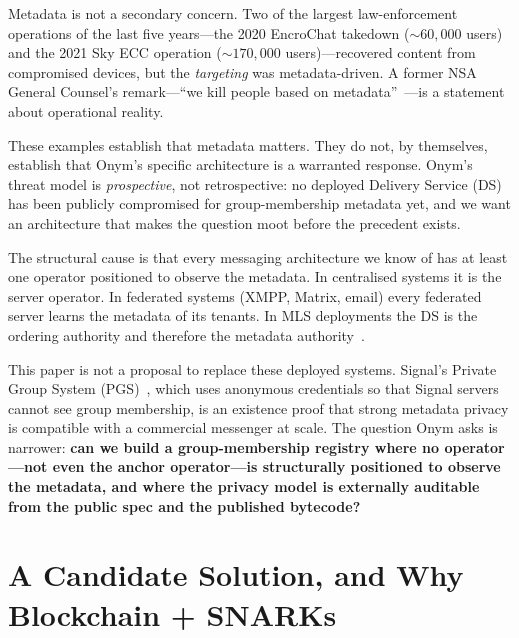 \documentclass[journal]{IEEEtran}
\begin{document}
Metadata is not a secondary concern. Two of the largest law-enforcement operations of the last five years---the 2020 EncroChat takedown (${\sim}60{,}000$ users) and the 2021 Sky ECC operation (${\sim}170{,}000$ users)---recovered content from compromised devices, but the \emph{targeting} was metadata-driven. A former NSA General Counsel's remark---``we kill people based on metadata''~\cite{hayden2014}---is a statement about operational reality.

These examples establish that metadata matters. They do not, by themselves, establish that Onym's specific architecture is a warranted response. Onym's threat model is \emph{prospective}, not retrospective: no deployed Delivery Service (DS) has been publicly compromised for group-membership metadata yet, and we want an architecture that makes the question moot before the precedent exists.

The structural cause is that every messaging architecture we know of has at least one operator positioned to observe the metadata. In centralised systems it is the server operator. In federated systems (XMPP, Matrix, email) every federated server learns the metadata of its tenants. In MLS deployments the DS is the ordering authority and therefore the metadata authority~\cite{barnes2023mls}.

This paper is not a proposal to replace these deployed systems. Signal's Private Group System (PGS)~\cite{chase2020signal}, which uses anonymous credentials so that Signal servers cannot see group membership, is an existence proof that strong metadata privacy is compatible with a commercial messenger at scale. The question Onym asks is narrower: \textbf{can we build a group-membership registry where no operator---not even the anchor operator---is structurally positioned to observe the metadata, and where the privacy model is externally auditable from the public spec and the published bytecode?}

\section{A Candidate Solution, and Why Blockchain + SNARKs}
\end{document}
